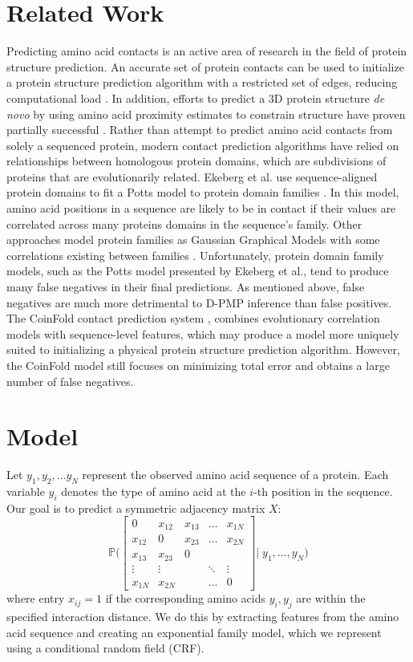 \documentclass{article}
\begin{document}
\section{Related Work}
Predicting amino acid contacts is an active area of research in the field of protein structure prediction. An accurate set of protein contacts can be used to initialize a protein structure prediction algorithm with a restricted set of edges, reducing computational load \cite{wuyun16}. In addition, efforts to predict a 3D protein structure \emph{de novo} by using amino acid proximity estimates to constrain structure have proven partially successful \cite{colwell11}. Rather than attempt to predict amino acid contacts from solely a sequenced protein, modern contact prediction algorithms have relied on relationships between homologous protein domains, which are subdivisions of proteins that are evolutionarily related. Ekeberg et al. use sequence-aligned protein domains to fit a Potts model to protein domain families \cite{ekeberg13}. In this model, amino acid positions in a sequence are likely to be in contact if their values are correlated across many proteins domains in the sequence's family. Other approaches model protein families as Gaussian Graphical Models with some correlations existing between families \cite{ma15}. Unfortunately, protein domain family models, such as the Potts model presented by Ekeberg et al., tend to produce many false negatives in their final predictions. As mentioned above, false negatives are much more detrimental to D-PMP inference than false positives. The CoinFold contact prediction system \cite{wang16}, combines evolutionary correlation models with sequence-level features, which may produce a model more uniquely suited to initializing a physical protein structure prediction algorithm. However, the CoinFold model still focuses on minimizing total error and obtains a large number of false negatives.
\section{Model}
Let $y_1, y_2, \ldots y_N$ represent the observed amino acid sequence of a protein. Each variable $y_i$ denotes the type of amino acid at the $i$-th position in the sequence. Our goal is to predict a symmetric adjacency matrix $X$:
\begin{equation} \label{eq:adjmatrix}
\mathbb{P}\Bigg(
\begin{bmatrix} 
0         & x_{12} & x_{13} & \dots   & x_{1N} \\
x_{12} & 0         & x_{23} & \dots   & x_{2N} \\
x_{13} & x_{23} & 0         &            &             \\
\vdots & \vdots  &            & \ddots & \vdots   \\
x_{1N} & x_{2N} &          & \dots    & 0
\end{bmatrix}
\Bigg| \; y_1, \ldots, y_N\Bigg) 
\end{equation}
where entry $x_{ij} = 1$ if the corresponding amino acids $y_i, y_j$ are within the specified interaction distance. We do this by extracting features from the amino acid sequence and creating an exponential family model, which we represent using a conditional random field (CRF). 
\end{document}
